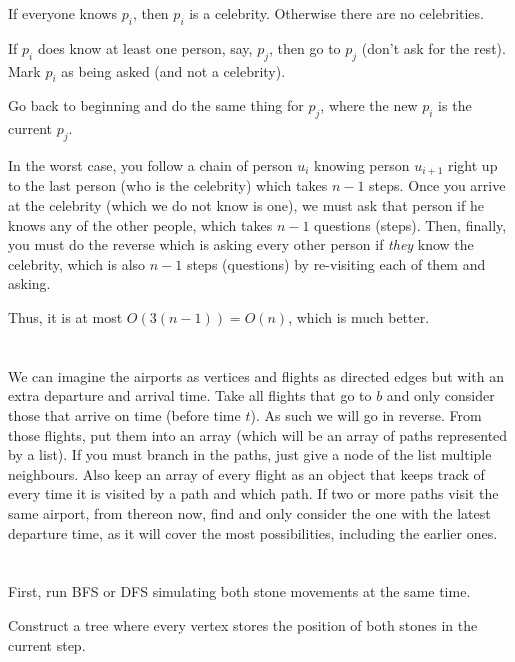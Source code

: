 \documentclass[11pt,letterpaper]{article}
\begin{document}
	If everyone knows $p_i$, then $p_i$ is a celebrity.
	Otherwise there are no celebrities.\newline
	
	If $p_i$ does know at least one person, say, $p_j$, then go to $p_j$ (don't ask for the rest). Mark $p_i$ as being asked (and not a celebrity).\newline
	
	Go back to beginning and do the same thing for $p_j$, where the new $p_i$ is the current $p_j$.\newline
	
	In the worst case, you follow a chain of person $u_i$ knowing person $u_{i+1}$ right up to the last person (who is the celebrity) which takes $n-1$ steps. Once you arrive at the celebrity (which we do not know is one), we must ask that person if he knows any of the other people, which takes $n-1$ questions (steps). Then, finally, you must do the reverse which is asking every other person if \textit{they} know the celebrity, which is also $n-1$ steps (questions) by re-visiting each of them and asking.
	
	Thus, it is at most $O(3(n-1))=O(n)$, which is much better.
	
	\section{}
	We can imagine the airports as vertices and flights as directed edges but with an extra departure and arrival time.
	Take all flights that go to $b$ and only consider those that arrive on time (before time $t$). As such we will go in reverse.
	From those flights, put them into an array (which will be an array of paths represented by a list).
	If you must branch in the paths, just give a node of the list multiple neighbours.
	Also keep an array of every flight as an object that keeps track of every time it is visited by a path and which path.
	If two or more paths visit the same airport, from thereon now, find and only consider the one with the latest departure time, as it will cover the most possibilities, including the earlier ones.
	
	
	\section{}
	First, run BFS or DFS simulating both stone movements at the same time.
	
	Construct a tree where every vertex stores the position of both stones in the current step.
	
\end{document}
